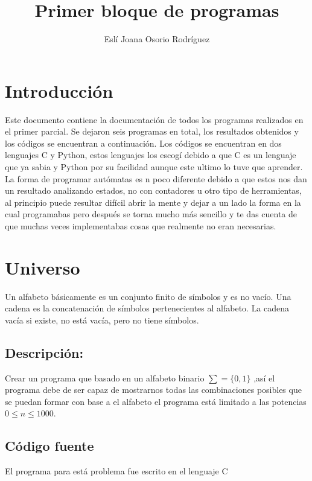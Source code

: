 \documentclass[12pt]{article}
\title{Primer bloque de programas}
\author{Eslí Joana Osorio Rodríguez}
\begin{document}
\maketitle

\newpage

\tableofcontents

\newpage

\section{Introducción}
Este documento contiene la documentación de todos los programas realizados en el primer parcial.
Se dejaron seis programas en total, los resultados obtenidos y los códigos se encuentran a continuación.
Los códigos se encuentran en dos lenguajes C y Python, estos lenguajes los escogí debido a que C es un lenguaje que ya sabia y Python por su facilidad aunque este ultimo lo tuve que aprender.
La forma de programar autómatas es n poco diferente debido a que estos nos dan un resultado analizando estados, no con contadores u otro tipo de herramientas, al principio puede resultar difícil abrir la mente y dejar a un lado la forma en la cual programabas pero después se torna mucho más sencillo y te das cuenta de que muchas veces implementabas cosas que realmente no eran necesarias.


\newpage

\section{Universo}
Un alfabeto básicamente es un conjunto finito de símbolos y es no vacío.
Una cadena es la concatenación de símbolos pertenecientes al alfabeto.
La cadena vacía si existe, no está vacía, pero no tiene símbolos.
 \cite{automatas}

\subsection{Descripción:}
Crear un programa que basado en un alfabeto binario $\sum = \lbrace 0, 1 \rbrace $ ,así el programa debe de ser capaz de mostrarnos todas las combinaciones posibles que se puedan formar con base a el alfabeto el programa está limitado a las potencias $0 \leq n \leq 1000$.

\subsection{Código fuente}
El programa para está problema fue escrito en el lenguaje C\\
\end{document}
